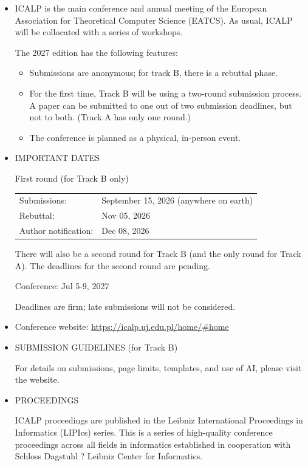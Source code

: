 \documentclass[prodmode,acmtecs]{acmsmall} %
\begin{document}
\begin{itemize}\item  ICALP is the main conference and annual meeting of the European Association for Theoretical Computer Science (EATCS). As usual, ICALP will be collocated with a series of workshops. 
 
  The 2027 edition has the following features: 
 
\begin{itemize}\item  Submissions are anonymous; for track B, there is a rebuttal phase. 
\item  For the first time, Track B will be using a two-round submission process. A paper can be submitted to one out of two submission deadlines, but not to both. (Track A has only one round.)
\item  The conference is planned as a physical, in-person event.
\end{itemize} 
\item  IMPORTANT DATES 
 
  First round (for Track B only) 
 
\begin{tabulary}{\linewidth}{LL}Submissions:  & September 15, 2026 (anywhere on earth) \\
Rebuttal:  & Nov 05, 2026 \\
Author notification:  & Dec 08, 2026 \\
\end{tabulary}
 
 There will also be a second round for Track B (and the only round for Track A). The deadlines for the second round are pending.  
 
Conference: Jul 5-9, 2027 
 
  Deadlines are firm; late submissions will not be considered. 
 
\item  Conference website: \href{https://icalp.uj.edu.pl/home/#home}{https://icalp.uj.edu.pl/home/\#home} 
 
\item  SUBMISSION GUIDELINES  (for Track B) 
 
  For details on submissions, page limits, templates, and use of AI, please visit the website. 
 
\item  PROCEEDINGS  
 
  ICALP proceedings are published in the Leibniz International Proceedings in Informatics (LIPIcs) series. This is a series of high-quality conference proceedings across all fields in informatics established in cooperation with Schloss Dagstuhl ? Leibniz Center for Informatics. 
 

\end{itemize}
\end{document}
